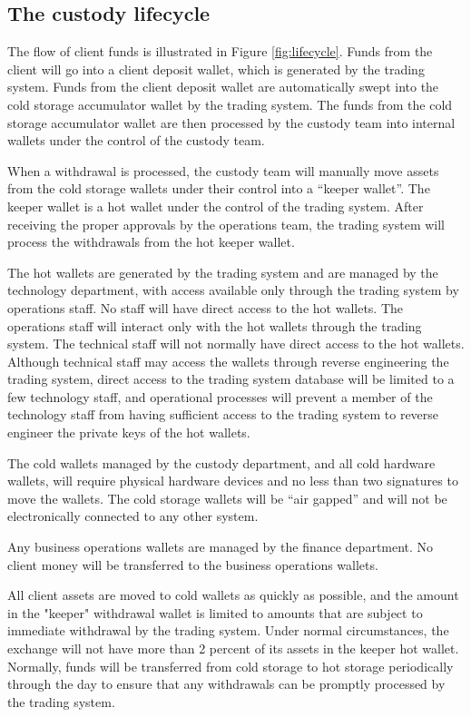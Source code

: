 \subsection{The custody lifecycle}
The flow of client funds is illustrated in Figure \ref{fig:lifecycle}.  Funds from the
client will go into a client deposit wallet, which is generated by the
trading system.  Funds from the client deposit wallet are
automatically swept into the cold storage accumulator wallet by the trading
system.  The funds from the cold storage accumulator wallet are then
processed by the custody team into internal wallets under the control
of the custody team.

When a withdrawal is processed, the custody team will manually move
assets from the cold storage wallets under their control into a
``keeper wallet''.  The keeper wallet is a hot wallet under the
control of the trading system.  After receiving the proper approvals
by the operations team, the trading system will process the withdrawals
from the hot keeper wallet. 

The hot wallets are generated by the trading system and are managed by
the technology department, with access available only through the
trading system by operations staff.  No staff will have direct access
to the hot wallets.  The operations staff will interact only with the
hot wallets through the trading system.  The technical staff will not
normally have direct access to the hot wallets.  Although technical
staff may access the wallets through reverse engineering the trading
system, direct access to the trading system database will be limited
to a few technology staff, and operational processes will
prevent a member of the technology staff from having sufficient access
to the trading system to reverse engineer the private keys of the
hot wallets.

The cold wallets managed by the custody department, and all cold
hardware wallets, will require physical hardware devices and no less
than two signatures to move the wallets.  The cold storage wallets
will be ``air gapped'' and will not be electronically connected to any
other system.

Any business operations wallets are managed by the finance
department.  No client money will be transferred to the business
operations wallets.

All client assets are moved to cold wallets as quickly as possible,
and the amount in the "keeper" withdrawal wallet is limited to
amounts that are subject to immediate withdrawal by the trading
system.  Under normal circumstances, the exchange will not have more
than 2 percent of its assets in the keeper hot wallet.  Normally,
funds will be transferred from cold storage to hot storage periodically
through the day to ensure that any withdrawals can be
promptly processed by the trading system.

